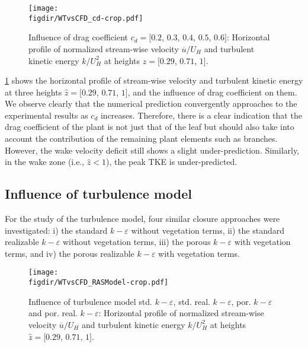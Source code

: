 \begin{figure}[p]
	\centering
	\texttt{[image: \\figdir/WTvsCFD\_cd-crop.pdf]}
	\caption{Influence of drag coefficient $c_d = [0.2$, $0.3$, $0.4$, $0.5$, $0.6]$: Horizontal profile of normalized stream-wise velocity $\overline{u}/U_H$ and turbulent kinetic energy $k/U_H^2$ at heights $\hat{z} = [0.29$, $0.71$, $1]$.}
	\label{fig:WTvsCFD_cd}
\end{figure}

\cref{fig:WTvsCFD_cd} shows the horizontal profile of  stream-wise velocity and turbulent kinetic energy at three heights $\hat{z} = [0.29$, $0.71$, $1]$, and the influence of drag coefficient on them. We observe clearly that the numerical prediction convergently approaches to the experimental results as $c_d$ increases. Therefore, there is a clear indication that the drag coefficient of the plant is not just that of the leaf but should also take into account the contribution of the remaining plant elements such as branches. However, the wake velocity deficit still shows a slight under-prediction. Similarly, in the wake zone (i.e., $\hat{z} < 1$), the peak TKE is under-predicted. 


\subsection{Influence of turbulence model}

For the study of the turbulence model, four similar closure approaches were investigated: i) the standard $k-\varepsilon$ without vegetation terms, ii) the standard realizable $k-\varepsilon$ without vegetation terms, iii) the porous $k-\varepsilon$ with vegetation terms, and iv) the porous realizable $k-\varepsilon$ with vegetation terms.

\begin{figure}[p]
	\centering
	\texttt{[image: \\figdir/WTvsCFD\_RASModel-crop.pdf]}
	\caption{Influence of turbulence model std. $k-\varepsilon$, std. real. $k-\varepsilon$, por. $k-\varepsilon$ and por. real. $k-\varepsilon$: Horizontal profile of normalized stream-wise velocity $\overline{u}/U_H$ and turbulent kinetic energy $k/U_H^2$ at heights $\hat{z} = [0.29$, $0.71$, $1]$.}
	\label{fig:WTvsCFD_RASModel}
\end{figure}

